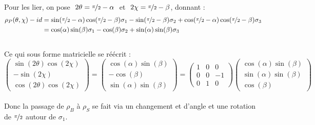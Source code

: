 \begin{annexe}
Pour les lier, on pose $\ 2\theta = \nicefrac{\pi}{2} - \alpha\ $ et $\ 2\chi = \nicefrac{\pi}{2} - \beta$, donnant :
\begin{align*}
\rho_P(\theta, \chi) - id 
	&= \sin(\nicefrac{\pi}{2} - \alpha) \cos(\nicefrac{\pi}{2} - \beta) \sigma_1 - \sin (\nicefrac{\pi}{2} - \beta) \sigma_2 + \cos(\nicefrac{\pi}{2} - \alpha) \cos(\nicefrac{\pi}{2} - \beta) \sigma_3 \\
	&= \cos(\alpha) \sin(\beta) \sigma_1 - \cos (\beta) \sigma_2 + \sin(\alpha) \sin(\beta) \sigma_3
\end{align*}
\\
Ce qui sous forme matricielle se réécrit :
\[\begin{pmatrix}
	\sin(2\theta) \cos(2\chi) \\ -\sin (2\chi) \\ \cos(2\theta) \cos(2\chi)
\end{pmatrix} = \begin{pmatrix}
	\cos(\alpha) \sin(\beta) \\ -\cos (\beta) \\ \sin(\alpha) \sin(\beta)
\end{pmatrix} = \begin{pmatrix}
	1 & 0 & 0 \\ 0 & 0 & -1 \\ 0 & 1 & 0
\end{pmatrix}\begin{pmatrix}
	\cos(\alpha) \sin(\beta) \\ \sin(\alpha) \sin(\beta) \\ \cos (\beta)
\end{pmatrix}\]
\\
Donc la passage de $\rho_B$ à $\rho_S$ se fait via un changement et d'angle et une rotation de $\nicefrac{\pi}{2}$ autour de $\sigma_1$.
\\


\end{annexe}
